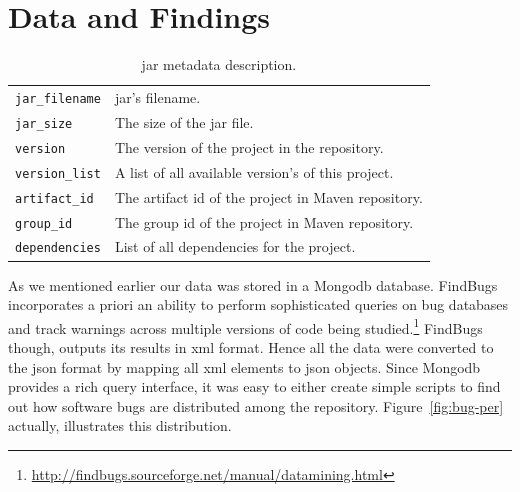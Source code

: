 \documentclass{sig-alternate}
\begin{document}
\section{Data and Findings}
\label{sec:find}

\begin{table}
\centering
\begin{tabular}{l p{5.0cm}}
 \hline
\verb|jar_filename| & {\sc jar}'s filename. \\
\verb|jar_size| & The size of the {\sc jar} file. \\
\verb|version| & The version of the project in the repository. \\
\verb|version_list| & A list of all available version's of this project. \\
\verb|artifact_id| & The artifact {\sc id} of the project in Maven repository. \\
\verb|group_id| & The group {\sc id} of the project in Maven repository. \\
\verb|dependencies| & List of all dependencies for the project. \\
 \hline
 \end{tabular}
\caption{{\sc jar} metadata description.}
\label{tbl:metadata-description}
\end{table}

As we mentioned earlier our data was stored in a
Mongo{\sc db} database.
FindBugs incorporates a priori an ability to perform
sophisticated queries on bug databases and
track warnings across multiple versions of code being
studied.\footnote{\url{http://findbugs.sourceforge.net/manual/datamining.html}}
FindBugs though,
outputs its results in  {\sc xml} format.
Hence all the data were
converted to the {\sc json} format
by mapping all {\sc xml} elements to {\sc json} objects.
Since Mongo{\sc db} provides a rich query interface,
it was easy to either create
simple scripts to find out
how software bugs are distributed among the
repository. Figure~\ref{fig:bug-per}
actually, illustrates this distribution.
\end{document}
